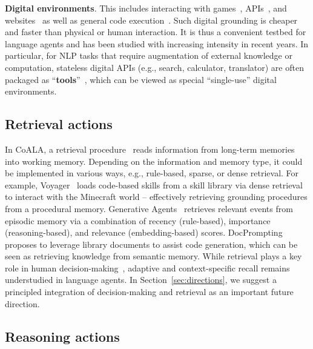 \documentclass[10pt]{article} %
\begin{document}
\textbf{Digital environments}. This includes interacting with games~\citep{hausknecht2020interactive, cote2019textworld, shridhar2020alfworld, wang2022scienceworld, liu2023minds}, APIs~\citep{schick2023toolformer,yao2022react, parisi2022talm, tang2023toolalpaca}, and websites~\citep{shi2017world,nakano2021webgpt,yao2022webshop,zhou2023webarena, gur2023real, deng2023mind2web} as well as general code execution~\citep{yang2023intercode, le2022coderl, ni2023lever}. Such digital grounding is cheaper and faster than physical or human interaction. It is thus a convenient testbed for language agents and has been studied with increasing intensity in recent years. In particular, for NLP tasks that require augmentation of external knowledge or computation, stateless digital APIs (e.g., search, calculator, translator) are often packaged as ``\textbf{tools}''~\citep{parisi2022talm, schick2023toolformer, xu2023gentopia, tang2023toolalpaca, qin2023toolllm}, which can be viewed as special ``single-use'' digital environments.

\subsection{Retrieval actions} \label{sec:retrieval}
In CoALA, a retrieval procedure~\citep{li2022survey, gu2018search} reads information from long-term memories into working memory. 
Depending on the information and memory type, it could be implemented in various ways, e.g., rule-based, sparse, or dense retrieval. 
For example, Voyager~\citep{wang2023voyager} loads code-based skills from a skill library via dense retrieval to interact with the Minecraft world -- effectively retrieving grounding procedures from a procedural memory. Generative Agents~\citep{park2023generative} retrieves relevant events from episodic memory via a combination of recency (rule-based), importance (reasoning-based), and relevance (embedding-based) scores. DocPrompting~\citep{zhou2022docprompting} proposes to leverage library documents to assist code generation, which can be seen as retrieving knowledge from semantic memory. While retrieval plays a key role in human decision-making~\citep{zhou2023episodic, zhao2022process}, adaptive and context-specific recall remains understudied in language agents. In Section~\ref{sec:directions}, we suggest a principled integration of decision-making and retrieval as an important future direction.


\subsection{Reasoning actions} \label{sec:reasoning}
\end{document}
